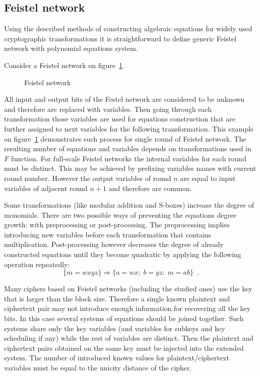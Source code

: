 \subsection{Feistel network}

Using the described methods of constructing algebraic equations for widely used
cryptographic transformations it is straightforward to define generic Feistel
network with polynomial equations system.

Consider a Feistel network on figure~\ref{fig:eq_feistel}. 
\begin{figure}[htbp]
	\centering
    
	\caption{Feistel network}
    \label{fig:eq_feistel}
\end{figure}
All input and output bits of the Festel network are considered to be unknown and
therefore are replaced with variables. Then going through each transformation
those variables are used for equations construction that are further assigned to
next variables for the following transformation. This example on
figure~\ref{fig:eq_feistel} demonstrates such process for single round of
Feistel network. The resulting number of equations and variables depends on
transformations used in $F$ function. For full-scale Feistel networks the
internal variables for each round must be distinct. This may be achieved by
prefixing variables names with current round number. However the output
variables of round $n$ are equal to input variables of adjacent round $n+1$ and
therefore are common.

Some transformations (like modular addition and S-boxes) increase the degree of
monomials. There are two possible ways of preventing the equations degree
growth: with preprocessing or post-processing. The preprocessing implies
introducing new variables before each transformation that contains
multiplication. Post-processing however decreases the degree of already
constructed equations until they become quadratic by applying the following
operation repeatedly:
\begin{equation}
\{m = w x y z\} \Rightarrow \{a = wx;\; b = yz;\; m = ab \}\enspace.
\end{equation}

Many ciphers based on Feistel networks (including the studied ones) use the key
that is larger than the block size. Therefore a single known plaintext and
ciphertext pair may not introduce enough information for recovering all the key
bits. In this case several systems of equations should be joined together. Such
systems share only the key variables (and variables for subkeys and key
scheduling if any) while the rest of variables are distinct. Then the plaintext
and ciphertext pairs obtained on the same key must be injected into the extended
system. The number of introduced known values for \mbox{plaintext/ciphertext}
variables must be equal to the unicity distance of the cipher.


